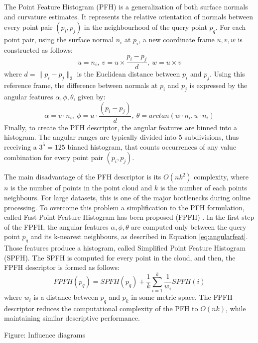 The Point Feature Histogram (PFH) \cite{rusuthesis} is a generalization of both surface normals and curvature estimates. It represents the relative orientation of normals between every point pair $(p_i,p_j)$ in the neighbourhood of the query point $p_q$. For each point pair, using the surface normal $n_i$ at $p_i$, a new coordinate frame $u,v,w$ is constructed as follows:
\begin{equation}
u = n_i,\  v = u \times \frac{p_i-p_j}{d},\  w = u \times v
\end{equation}
where $d = \|p_i-p_j\|_2$ is the Euclidean distance between $p_i$ and $p_j$. Using this reference frame, the difference between normals at $p_i$ and $p_j$ is expressed by the angular features $\alpha, \phi, \theta$, given by:
\begin{equation}
\alpha = v \cdot n_i, \  \phi = u \cdot \frac{(p_i-p_j)}{d}, \ \theta = arctan(w\cdot n_i, u \cdot n_i)
\label{eq:angularfeat}
\end{equation}
Finally, to create the PFH descriptor, the angular features are binned into a histogram. The angular ranges are typically divided into 5 subdivisions, thus receiving a $3^5=125$ binned histogram, that counts occurrences of any value combination for every point pair $(p_i, p_j)$.

The main disadvantage of the PFH descriptor is its $O(nk^2)$ complexity, where $n$ is the number of points in the point cloud and $k$ is the number of each points neighbours. For large datasets, this is one of the major bottlenecks during online processing. To overcome this problem a simplification to the PFH formulation, called Fast Point Feature Histogram has been proposed (FPFH) \cite{rusufpfg}. In the first step of the FPFH, the angular features $\alpha, \phi, \theta$ are computed only between the query point $p_q$ and its k-nearest neighbours, as described in Equation \ref{eq:angularfeat}. Those features produce a histogram, called Simplified Point Feature Histogram (SPFH). The SPFH is computed for every point in the cloud, and then, the FPFH descriptor is formed as follows:
\begin{equation}
FPFH(p_q) = SPFH(p_q) + \frac{1}{k}\sum\limits_{i=1}^k\frac{1}{w_i}SPFH(i)
\end{equation}
where $w_i$ is a distance between $p_q$ and $p_k$ in some metric space. The FPFH descriptor reduces the computational complexity of the PFH to $O(nk)$, while maintaining similar descriptive performance.

Figure: Influence diagrams

